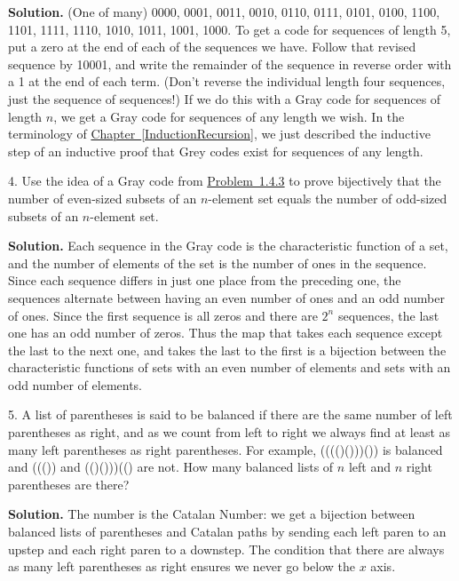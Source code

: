 \documentclass[10pt,]{book}
\theoremstyle{plain}
\theoremstyle{definition}
\theoremstyle{definition}
\numberwithin{equation}{chapter}
\begin{document}
\begin{exerciselist}
\par\smallskip
\noindent\textbf{Solution.}\hypertarget{solution-110}{}\quad
(One of many) 0000, 0001, 0011, 0010, 0110, 0111, 0101, 0100, 1100, 1101, 1111, 1110, 1010, 1011, 1001, 1000. To get a code for sequences of length 5, put a zero at the end of each of the sequences we have. Follow that revised sequence by 10001, and write the remainder of the sequence in reverse order with a 1 at the end of each term. (Don't reverse the individual length four sequences, just the sequence of sequences!) If we do this with a Gray code for sequences of length \(n\), we get a Gray code for sequences of any length we wish. In the terminology of \hyperref[InductionRecursion]{Chapter~\ref{InductionRecursion}}, we just described the inductive step of an inductive proof that Grey codes exist for sequences of any length.%
\item[4.]\hypertarget{exercise-4}{}Use the idea of a Gray code from \hyperlink{GreyCode}{Problem~1.4.3} to prove bijectively that the number of even-sized subsets of an \(n\)-element set equals the number of odd-sized subsets of an \(n\)-element set.%
\par\smallskip
\par\smallskip
\noindent\textbf{Solution.}\hypertarget{solution-111}{}\quad
Each sequence in the Gray code is the characteristic function of a set, and the number of elements of the set is the number of ones in the sequence. Since each sequence differs in just one place from the preceding one, the sequences alternate between having an even number of ones and an odd number of ones. Since the first sequence is all zeros and there are \(2^n\) sequences, the last one has an odd number of zeros. Thus the map that takes each sequence except the last to the next one, and takes the last to the first is a bijection between the characteristic functions of sets with an even number of elements and sets with an odd number of elements.%
\item[5.]\hypertarget{exercise-5}{}A list of parentheses is said to be balanced if there are the same number of left parentheses as right, and as we count from left to right we always find at least as many left parentheses as right parentheses.  For example, (((()()))()) is balanced and ((()) and (()()))(() are not.  How many balanced lists of \(n\) left and \(n\) right parentheses are there?%
\par\smallskip
\par\smallskip
\noindent\textbf{Solution.}\hypertarget{solution-112}{}\quad
The number is the Catalan Number: we get a bijection between balanced lists of parentheses and Catalan paths by sending each left paren to an upstep and each right paren to a downstep. The condition that there are always as many left parentheses as right ensures we never go below the \(x\) axis.%

\end{exerciselist}
\end{document}
